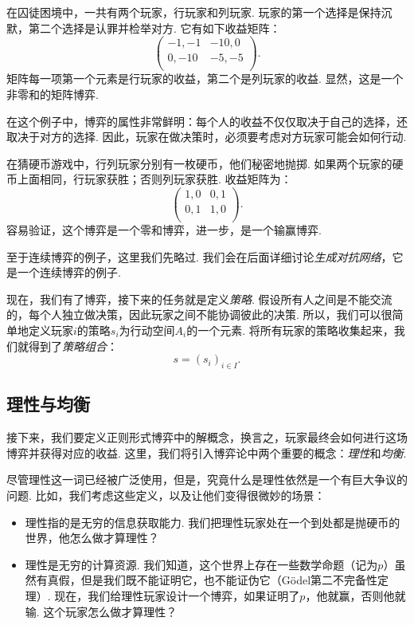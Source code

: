\begin{example}[囚徒困境]\label{ex:prisoner}
在囚徒困境中，一共有两个玩家，行玩家和列玩家. 玩家的第一个选择是保持沉默，第二个选择是认罪并检举对方. 它有如下收益矩阵：
\[
\begin{pmatrix}
-1,-1&-10,0\\
0,-10&-5,-5\\
\end{pmatrix}.
\]
矩阵每一项第一个元素是行玩家的收益，第二个是列玩家的收益. 显然，这是一个非零和的矩阵博弈. 

在这个例子中，博弈的属性非常鲜明：每个人的收益不仅仅取决于自己的选择，还取决于对方的选择. 因此，玩家在做决策时，必须要考虑对方玩家可能会如何行动. 
\end{example}

\begin{example}[猜硬币游戏]\label{ex:matching-pennies}
在猜硬币游戏中，行列玩家分别有一枚硬币，他们秘密地抛掷. 如果两个玩家的硬币上面相同，行玩家获胜；否则列玩家获胜. 收益矩阵为：
    \[
    \begin{pmatrix}
    1,0&0,1\\
    0,1&1,0\\
    \end{pmatrix}.
    \]
容易验证，这个博弈是一个零和博弈，进一步，是一个输赢博弈.
\end{example}

至于连续博弈的例子，这里我们先略过. 我们会在后面详细讨论\emph{生成对抗网络}，它是一个连续博弈的例子.

现在，我们有了博弈，接下来的任务就是定义\emph{策略}. 假设所有人之间是不能交流的，每个人独立做决策，因此玩家之间不能协调彼此的决策. 所以，我们可以很简单地定义玩家$i$的策略$s_i$为行动空间$A_i$的一个元素. 将所有玩家的策略收集起来，我们就得到了\emph{策略组合}：
\[
s=(s_i)_{i\in I}.
\]

\subsection{理性与均衡}

接下来，我们要定义正则形式博弈中的解概念，换言之，玩家最终会如何进行这场博弈并获得对应的收益. 这里，我们将引入博弈论中两个重要的概念：\emph{理性}和\emph{均衡}. 

尽管理性这一词已经被广泛使用，但是，究竟什么是理性依然是一个有巨大争议的问题. 比如，我们考虑这些定义，以及让他们变得很微妙的场景：
\begin{itemize}
    \item 理性指的是无穷的信息获取能力. 我们把理性玩家处在一个到处都是抛硬币的世界，他怎么做才算理性？
    \item 理性是无穷的计算资源. 我们知道，这个世界上存在一些数学命题（记为$p$）虽然有真假，但是我们既不能证明它，也不能证伪它（Gödel第二不完备性定理）. 现在，我们给理性玩家设计一个博弈，如果证明了$p$，他就赢，否则他就输. 这个玩家怎么做才算理性？
\end{itemize}

